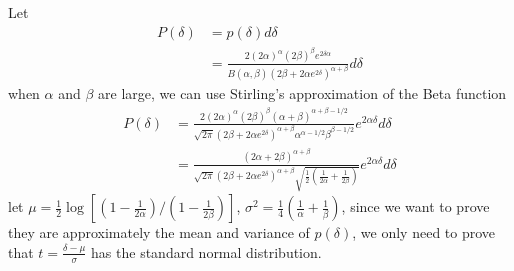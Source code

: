 \documentclass[11pt]{article}
\begin{document}
    Let \[\begin{align}
    P(\delta)&=p(\delta)d\delta \\
    &= \frac{2(2\alpha)^{\alpha}(2\beta)^{\beta}e^{2\delta\alpha}}{B(\alpha,\beta)(2\beta+2\alpha e^{2\delta})^{\alpha+\beta}}d\delta
\end{align}\] when \(\alpha\) and \(\beta\) are large, we can use
Stirling's approximation of the Beta function \[\begin{align}
    P(\delta)&= \frac{2(2\alpha)^{\alpha}(2\beta)^{\beta}(\alpha+\beta)^{\alpha+\beta-1/2}}{\sqrt{2\pi}(2\beta+2\alpha e^{2\delta})^{\alpha+\beta}\alpha^{\alpha-1/2}\beta^{\beta-1/2}}e^{2\alpha\delta}d\delta \\
    &= \frac{(2\alpha+2\beta)^{\alpha+\beta}}{\sqrt{2\pi}(2\beta+2\alpha e^{2\delta})^{\alpha+\beta}\sqrt{\frac{1}{2}(\frac{1}{2\alpha}+\frac{1}{2\beta})}}e^{2\alpha\delta}d\delta
\end{align}\] let
\(\mu=\frac{1}{2}\log\left[(1-\frac{1}{2\alpha})/(1-\frac{1}{2\beta})\right]\),
\(\sigma^2=\frac{1}{4}\left(\frac{1}{\alpha}+\frac{1}{\beta}\right)\),
since we want to prove they are approximately the mean and variance of
\(p(\delta)\), we only need to prove that
\(t=\frac{\delta-\mu}{\sigma}\) has the standard normal distribution.\\
\end{document}
